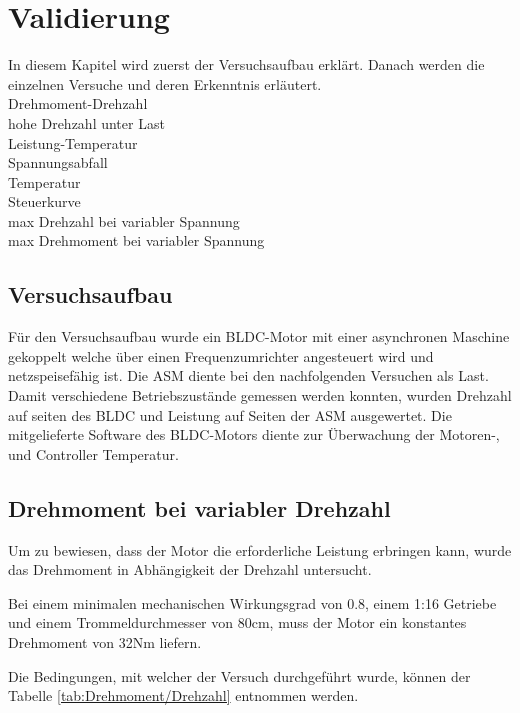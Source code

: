 \section{Validierung}\label{sec:Validierung}
In diesem Kapitel wird zuerst der Versuchsaufbau erklärt. Danach werden die einzelnen Versuche und deren Erkenntnis erläutert.\\
Drehmoment-Drehzahl\\
hohe Drehzahl unter Last\\
Leistung-Temperatur\\
Spannungsabfall\\
Temperatur\\
Steuerkurve\\
max Drehzahl bei variabler Spannung\\
max Drehmoment bei variabler Spannung\\

\subsection{Versuchsaufbau}\label{subsec:Versuchsaufbau}
Für den Versuchsaufbau wurde ein BLDC-Motor mit einer asynchronen Maschine gekoppelt welche über einen Frequenzumrichter angesteuert wird und netzspeisefähig ist. Die ASM diente bei den nachfolgenden Versuchen als Last. Damit verschiedene Betriebszustände gemessen werden konnten, wurden Drehzahl auf seiten des BLDC und Leistung auf Seiten der ASM ausgewertet. Die mitgelieferte Software des BLDC-Motors diente zur Überwachung der Motoren-, und Controller Temperatur.


\subsection{Drehmoment bei variabler Drehzahl}\label{subsec:DrehmomentDrehzahl}
Um zu bewiesen, dass der Motor die erforderliche Leistung erbringen kann, wurde das Drehmoment in Abhängigkeit der Drehzahl untersucht.

Bei einem minimalen mechanischen Wirkungsgrad von 0.8, einem 1:16 Getriebe und einem Trommeldurchmesser von 80cm, muss der Motor ein konstantes Drehmoment von 32Nm liefern. 

Die Bedingungen, mit welcher der Versuch durchgeführt wurde, können der Tabelle \ref{tab:Drehmoment/Drehzahl} entnommen werden.

